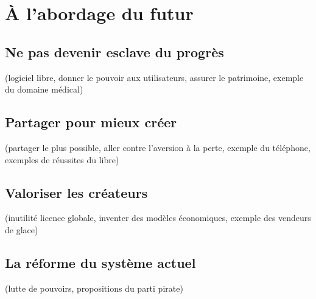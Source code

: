 \chapter{À l'abordage du futur}

\section{Ne pas devenir esclave du progrès}
(logiciel libre, donner le pouvoir aux utilisateurs, assurer le patrimoine, exemple du domaine médical)
\section{Partager pour mieux créer}
(partager le plus possible, aller contre l'aversion à la perte, exemple du téléphone, exemples de réussites du libre)
\section{Valoriser les créateurs}
(inutilité licence globale, inventer des modèles économiques, exemple des vendeurs de glace)
\section{La réforme du système actuel}
(lutte de pouvoirs, propositions du parti pirate)
